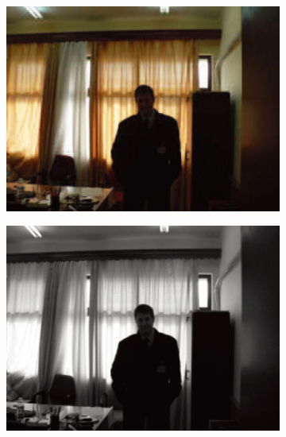 \documentclass[letterpaper,10pt]{article}
\begin{document}
\begin{figure}[htbp]
				\begin{subfigure}{0.11\textwidth}
					\includegraphics[width=\linewidth]{picture/LLIE/Division Gets Better/RGB-low light2}
					\captionsetup{font=scriptsize}
					\label{fig: RGB-low light2}
				\end{subfigure}
				\begin{subfigure}{0.11\textwidth}
					\includegraphics[width=\linewidth]{picture/LLIE/Division Gets Better/R2}
					\captionsetup{font=scriptsize}
					\label{fig: R2}
				\end{subfigure}
				\begin{subfigure}{0.11\textwidth}

\end{subfigure}
\end{figure}
\end{document}
